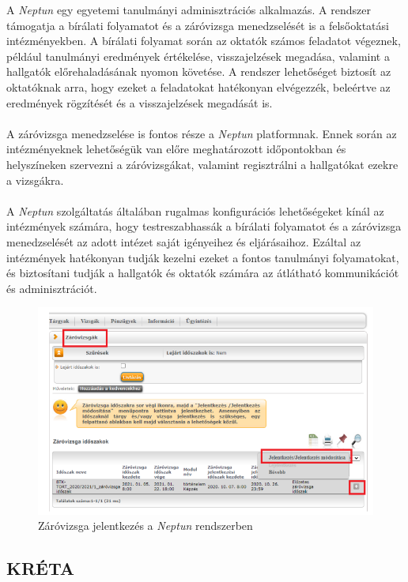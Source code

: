 A \textit{Neptun} \cite{neptun} egy egyetemi tanulmányi adminisztrációs alkalmazás. A rendszer támogatja a bírálati folyamatot és a záróvizsga menedzselését is a felsőoktatási intézményekben. A bírálati folyamat során az oktatók számos feladatot végeznek, például tanulmányi eredmények értékelése, visszajelzések megadása, valamint a hallgatók előrehaladásának nyomon követése. A rendszer lehetőséget biztosít az oktatóknak arra, hogy ezeket a feladatokat hatékonyan elvégezzék, beleértve az eredmények rögzítését és a visszajelzések megadását is.\\
\\
A záróvizsga menedzselése is fontos része a \textit{Neptun} platformnak. Ennek során az intézményeknek lehetőségük van előre meghatározott időpontokban és helyszíneken szervezni a záróvizsgákat, valamint regisztrálni a hallgatókat ezekre a vizsgákra.\\
\\
A \textit{Neptun} szolgáltatás általában rugalmas konfigurációs lehetőségeket kínál az intézmények számára, hogy testreszabhassák a bírálati folyamatot és a záróvizsga menedzselését az adott intézet saját igényeihez és eljárásaihoz. Ezáltal az intézmények hatékonyan tudják kezelni ezeket a fontos tanulmányi folyamatokat, és biztosítani tudják a hallgatók és oktatók számára az átlátható kommunikációt és adminisztrációt.

\begin{figure}[h]
\centering
\includegraphics[scale=0.7]{images/Neptun.png}
\caption{Záróvizsga jelentkezés a \textit{Neptun} rendszerben\cite{neptunzv}}
\label{fig:neptunzv}
\end{figure}

\newpage
\subsection{\textbf{KRÉTA}}

